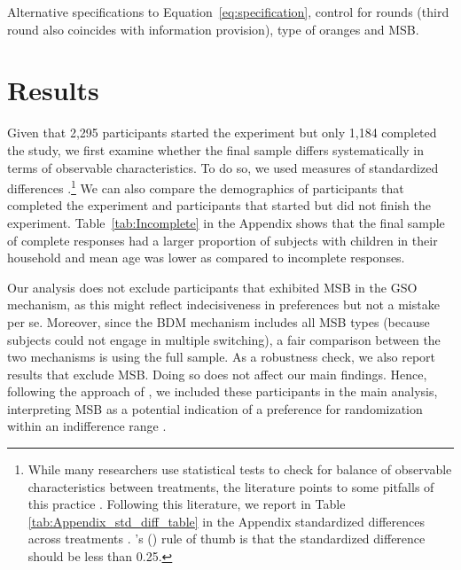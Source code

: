 \documentclass[12pt]{article}
\newcommand\citeapos[1]{\citeauthor{#1}'s (\citeyear{#1})} %
\begin{document}
Alternative specifications to Equation~\ref{eq:specification}, control for rounds (third round also coincides with information provision), type of oranges and MSB.

\section{Results}
\label{Results}


Given that 2,295 participants started the experiment but only 1,184 completed the study, we first examine whether the final sample differs systematically in terms of observable characteristics. To do so, we used measures of standardized differences \citep{CochranRubin1973}.\footnote{While many researchers use statistical tests to check for balance of observable characteristics between treatments, the literature points to some pitfalls of this practice \citep[e.g.,][]{canavari2019run,DeatonCartwright2016,BrizEtAl2017,HoEtAl2007,MoherEtAl2010,MutzPemantle2015}. Following this literature, we report in Table \ref{tab:Appendix_std_diff_table} in the Appendix standardized differences across treatments \citep{ImbensRubin2016,ImbensWooldridge2009}. \citeapos{CochranRubin1973} rule of thumb is that the standardized difference should be less than 0.25.}  We can also compare the demographics of participants that completed the experiment and participants that started but did not finish the experiment. Table~\ref{tab:Incomplete} in the Appendix shows that the final sample of complete responses had a larger proportion of subjects with children in their household and mean age was lower as compared to incomplete responses.

Our analysis does not exclude participants that exhibited MSB in the GSO mechanism, as this might reflect indecisiveness in preferences but not a mistake per se. Moreover, since the BDM mechanism includes all MSB types (because subjects could not engage in multiple switching), a fair comparison between the two mechanisms is using the full sample. As a robustness check, we also report results that exclude MSB. Doing so does not affect our main findings. Hence, following the approach of \citet{brown2018separated}, we included these participants in the main analysis, interpreting MSB as a potential indication of a preference for randomization within an indifference range \citep{agranov2023stable}. 
\end{document}

